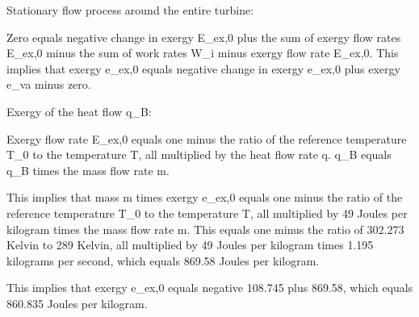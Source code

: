 Stationary flow process around the entire turbine:

Zero equals negative change in exergy E_ex,0 plus the sum of exergy flow rates E_ex,0 minus the sum of work rates W_i minus exergy flow rate E_ex,0. This implies that exergy e_ex,0 equals negative change in exergy e_ex,0 plus exergy e_va minus zero.

Exergy of the heat flow q_B:

Exergy flow rate E_ex,0 equals one minus the ratio of the reference temperature T_0 to the temperature T, all multiplied by the heat flow rate q. q_B equals q_B times the mass flow rate m.

This implies that mass m times exergy e_ex,0 equals one minus the ratio of the reference temperature T_0 to the temperature T, all multiplied by 49 Joules per kilogram times the mass flow rate m. This equals one minus the ratio of 302.273 Kelvin to 289 Kelvin, all multiplied by 49 Joules per kilogram times 1.195 kilograms per second, which equals 869.58 Joules per kilogram.

This implies that exergy e_ex,0 equals negative 108.745 plus 869.58, which equals 860.835 Joules per kilogram.